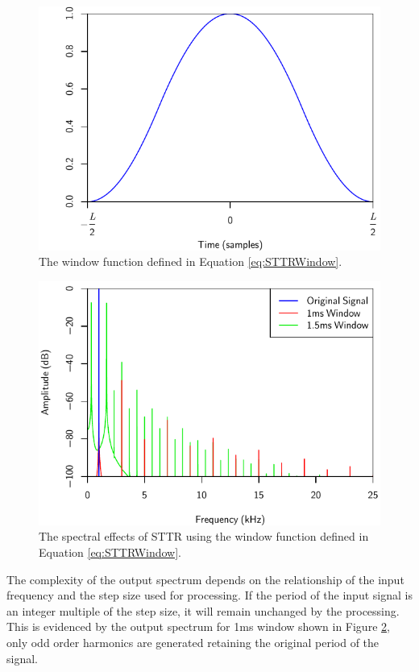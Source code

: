			\begin{figure}[h!]
				\centering
				\includegraphics{chapter5/Images/STTRWindow.pdf}
				\caption{The window function defined in Equation \ref{eq:STTRWindow}.}
				\label{fig:STTRWindow}
			\end{figure}

			\begin{figure}[h!]
				\centering
				\includegraphics{chapter5/Images/STTRSpectra.pdf}
				\caption{The spectral effects of STTR using the window function defined in Equation
				         \ref{eq:STTRWindow}.}
				\label{fig:STTRSpectra}
			\end{figure}

			The complexity of the output spectrum depends on the relationship of the input frequency and the
			step size used for processing. If the period of the input signal is an integer multiple of the step
			size, it will remain unchanged by the processing. This is evidenced by the output spectrum for 1ms
			window shown in Figure \ref{fig:STTRSpectra}, only odd order harmonics are generated retaining the
			original period of the signal.

